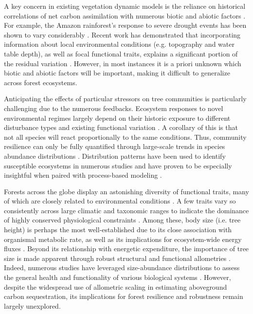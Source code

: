 A key concern in existing vegetation dynamic models is the reliance on historical correlations of net carbon assimilation with numerous biotic and abiotic factors \cite{allen_underestimation_2015, barnes2022a}. For example, the Amazon rainforest’s response to severe drought events has been shown to vary considerably \cite{anderegg_divergent_2020, saleska_amazon_2007}. Recent work has demonstrated that incorporating information about local environmental conditions (e.g. topography and water table depth), as well as focal functional traits, explains a significant portion of the residual variation \cite{chen_amazon_2024, signori-muller_non-structural_2021, tavares_basin-wide_2023}. However, in most instances it is a priori unknown which biotic and abiotic factors will be important, making it difficult to generalize across forest ecosystems. 

Anticipating the effects of particular stressors on tree communities is particularly challenging due to the numerous feedbacks. Ecosystem responses to novel environmental regimes largely depend on their historic exposure to different disturbance types and existing functional variation \cite{renes_disturbance_2020, hoffmann_environmental_2000}. A corollary of this is that not all species will react proportionally to the same conditions. Thus, community resilience can only be fully quantified through large-scale trends in species abundance distributions \cite{loreau2010a, arnoldi_how_2018}. Distribution patterns have been used to identify susceptible ecosystems in numerous studies \cite{chaalali_species_2016, padfield_linking_2018, pecl_biodiversity_2017} and have proven to be especially insightful when paired with process-based modeling \cite{dakos2011a}. 

Forests across the globe display an astonishing diversity of functional traits, many of which are closely related to environmental conditions \cite{lopez_coordination_2021, reich2014a}. A few traits vary so consistently across large climatic and taxonomic ranges to indicate the dominance of highly conserved physiological constraints \cite{delong_shifts_2010, hatton2019a, wright2004a}. Among these, body size (i.e. tree height) is perhaps the most well-established due to its close association with organismal metabolic rate, as well as its implications for ecosystem-wide energy fluxes \cite{allen2005a, brown2004a, savage_sizing_2008}. Beyond its relationship with energetic expenditure, the importance of tree size is made apparent through robust structural and functional allometries \cite{chave_improved_2014, goodman_importance_2014, niklas_invariant_2001}. Indeed, numerous studies have leveraged size-abundance distributions to assess the general health and functionality of various biological systems \cite{chaalali_species_2016, guo_size_2022, spanbauer_body_2016}. However, despite the widespread use of allometric scaling in estimating aboveground carbon sequestration, its implications for forest resilience and robustness remain largely unexplored. 

